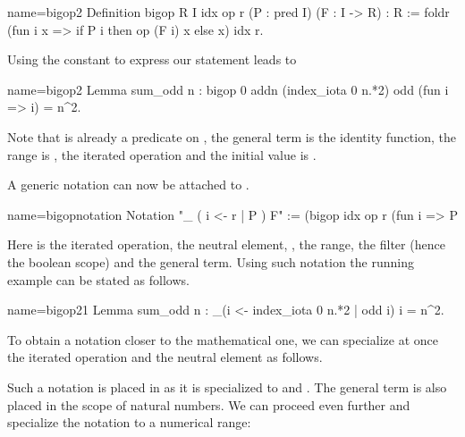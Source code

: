 \begin{coq}{name=bigop2}{}
Definition bigop R I idx op r (P : pred I) (F : I -> R) : R :=
  foldr (fun i x => if P i then op (F i) x else x) idx r.
\end{coq}

Using the  constant to express our statement leads to

\begin{coq}{name=bigop2}{}
Lemma sum_odd n :
  bigop 0 addn (index_iota 0 n.*2) odd (fun i => i) = n^2.
\end{coq}

Note that  is already a predicate on , the general
term is the identity function, the range  is , the iterated operation  and the initial value is
.

A generic notation can now be attached to .

\begin{coq}{name=bigopnotation}{}
Notation "\big [ op / idx ]_ ( i <- r | P ) F" :=
  (bigop idx op r (fun i => P%
\end{coq}

Here  is the iterated operation,  the neutral element,
, the range,  the filter (hence the boolean scope)
and  the general term.  Using such notation the running example
can be stated as follows.

\begin{coq}{name=bigop21}{}
Lemma sum_odd n : \big[addn/0]_(i <- index_iota 0 n.*2 | odd i) i = n^2.
\end{coq}

To obtain a notation closer to the mathematical one, we can specialize
at once the iterated operation and the neutral element as follows.

\index[coq]{\C{\\sum}}

Such a notation is placed in  as it is specialized
to  and .  The general term  is also placed in
the scope of natural numbers.
We can proceed even further and specialize the notation to
a numerical range:

